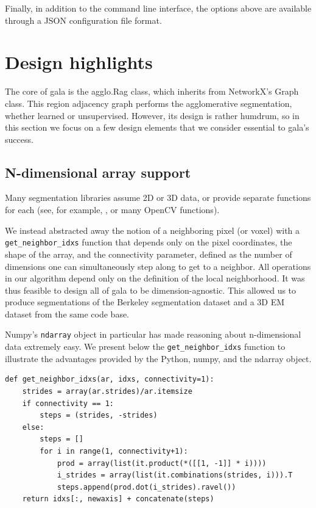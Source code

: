 \documentclass{frontiersSCNS} %
\begin{document}
Finally, in addition to the command line interface, the options above are available through a JSON configuration file format.


\section{Design highlights}

The core of gala is the agglo.Rag class, which inherits from NetworkX's Graph class.
This region adjacency graph performs the agglomerative segmentation, whether learned or unsupervised.
However, its design is rather humdrum, so in this section we focus on a few design elements that we consider essential to gala's success.

\subsection{N-dimensional array support}

Many segmentation libraries assume 2D or 3D data, or provide separate functions for each (see, for example, \cite{slic-website}, or many OpenCV functions).

We instead abstracted away the notion of a neighboring pixel (or voxel) with a \texttt{\small get\_neighbor\_idxs} function that depends only on the pixel coordinates, the shape of the array, and the connectivity parameter, defined as the number of dimensions one can simultaneously step along to get to a neighbor.
All operations in our algorithm depend only on the definition of the local neighborhood. 
It was thus feasible to design all of gala to be dimension-agnostic.
This allowed us to produce segmentations of the Berkeley segmentation dataset \citep{MartinFTM01} and a 3D EM dataset from the same code base.

Numpy's \texttt{\small ndarray} object in particular has made reasoning about n-dimensional data extremely easy.
We present below the \texttt{\small get\_neighbor\_idxs} function to illustrate the advantages provided by the Python, numpy, and the ndarray object.

{\small
\begin{verbatim}
def get_neighbor_idxs(ar, idxs, connectivity=1):
    strides = array(ar.strides)/ar.itemsize
    if connectivity == 1: 
        steps = (strides, -strides)
    else:
        steps = []
        for i in range(1, connectivity+1):
            prod = array(list(it.product(*([[1, -1]] * i))))
            i_strides = array(list(it.combinations(strides, i))).T
            steps.append(prod.dot(i_strides).ravel())
    return idxs[:, newaxis] + concatenate(steps)
\end{verbatim}
}
\end{document}
